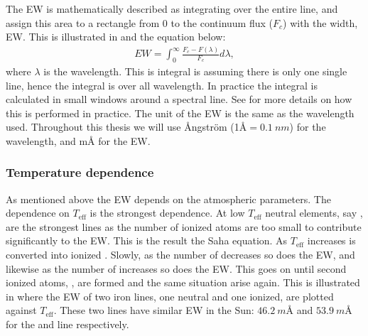 The EW is mathematically described as integrating over the entire line, and assign this area to a
rectangle from 0 to the continuum flux ($F_c$) with the width, EW. This is illustrated in
 and the equation below: \begin{align} EW = \int_{0}^{\infty}
\frac{F_c-F(\lambda)}{F_c} d\lambda, \end{align} where $\lambda$ is the wavelength. This is integral
is assuming there is only one single line, hence the integral is over all wavelength. In practice
the integral is calculated in small windows around a spectral line. See  for
more details on how this is performed in practice. The unit of the EW is the same as the wavelength
used. Throughout this thesis we will use \AA{}ngstr\"{o}m (1\AA$=\SI{0.1}{nm}$) for the wavelength,
and m\AA{} for the EW.


\subsubsection{Temperature dependence}

As mentioned above the EW depends on the atmospheric parameters. The dependence on $T_\mathrm{eff}$
is the strongest dependence. At low $T_\mathrm{eff}$ neutral elements, say , are the
strongest lines as the number of ionized atoms are too small to contribute significantly to the EW.
This is the result the Saha equation. As $T_\mathrm{eff}$ increases  is converted into
ionized . Slowly, as the number of  decreases so does the EW, and likewise as
the number of  increases so does the EW. This goes on until second ionized atoms,
, are formed and the same situation arise again. This is illustrated in
 where the EW of two iron lines, one neutral and one ionized, are plotted against
$T_\mathrm{eff}$. These two lines have similar EW in the Sun: $\SI{46.2}{m}$\AA{} and
$\SI{53.9}{m}$\AA{} for the  and  line respectively.

